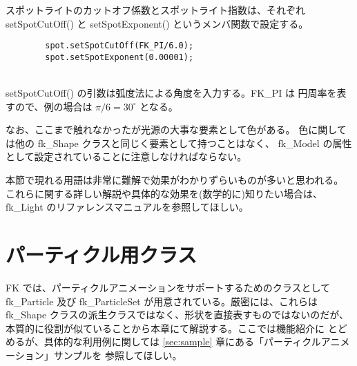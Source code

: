 スポットライトのカットオフ係数とスポットライト指数は、それぞれ
setSpotCutOff() と setSpotExponent() というメンバ関数で設定する。
\\
\begin{screen}
\begin{verbatim}
        spot.setSpotCutOff(FK_PI/6.0);
        spot.setSpotExponent(0.00001);
\end{verbatim}
\end{screen}
~ \\
setSpotCutOff() の引数は弧度法による角度を入力する。FK\_PI は
円周率を表すので、例の場合は \(\pi/6 = 30^{\circ}\) となる。

なお、ここまで触れなかったが光源の大事な要素として色がある。
色に関しては他の fk\_Shape クラスと同じく要素として持つことはなく、
fk\_Model の属性として設定されていることに注意しなければならない。

本節で現れる用語は非常に難解で効果がわかりずらいものが多いと思われる。
これらに関する詳しい解説や具体的な効果を(数学的に)知りたい場合は、
fk\_Light のリファレンスマニュアルを参照してほしい。

\section{パーティクル用クラス} \label{subsec:particle}
FK では、パーティクルアニメーションをサポートするためのクラスとして
fk\_Particle 及び fk\_ParticleSet が用意されている。厳密には、これらは
fk\_Shape クラスの派生クラスではなく、形状を直接表すものではないのだが、
本質的に役割が似ていることから本章にて解説する。ここでは機能紹介に
とどめるが、具体的な利用例に関しては
\ref{sec:sample} 章にある「パーティクルアニメーション」サンプルを
参照してほしい。

